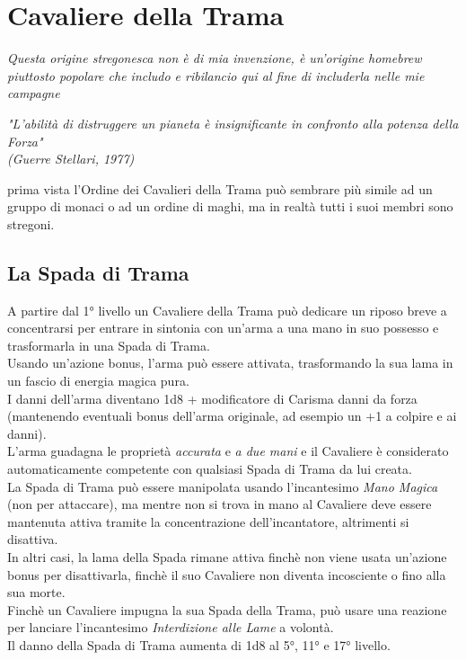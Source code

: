\section{Cavaliere della Trama}
\textit{Questa origine stregonesca non è di mia invenzione, è un'origine homebrew piuttosto popolare che includo e ribilancio qui al fine di includerla nelle mie campagne}

\begin{DndReadAloud}
  \it
  "L'abilità di distruggere un pianeta è insignificante in confronto alla potenza della Forza" \\ (Guerre Stellari, 1977)
\end{DndReadAloud}

 prima vista l'Ordine dei Cavalieri della Trama può sembrare più simile ad un gruppo di monaci o ad un ordine di maghi, ma in realtà tutti i suoi membri sono stregoni.

\subsection{La Spada di Trama}

A partire dal 1° livello un Cavaliere della Trama può dedicare un riposo breve a concentrarsi per entrare in sintonia con un'arma a una mano in suo possesso e trasformarla in una Spada di Trama. \\ Usando un'azione bonus, l'arma può essere attivata, trasformando la sua lama in un fascio di energia magica pura. \\ I danni dell'arma diventano 1d8 + modificatore di Carisma danni da forza (mantenendo eventuali bonus dell'arma originale, ad esempio un +1 a colpire e ai danni). \\ L'arma guadagna le proprietà \textit{accurata} e \textit{a due mani} e il Cavaliere è considerato automaticamente competente con qualsiasi Spada di Trama da lui creata. \\ La Spada di Trama può essere manipolata usando l'incantesimo \textit{Mano Magica} (non per attaccare), ma mentre non si trova in mano al Cavaliere deve essere mantenuta attiva tramite la concentrazione dell'incantatore, altrimenti si disattiva. \\ In altri casi, la lama della Spada rimane attiva finchè non viene usata un'azione bonus per disattivarla, finchè il suo Cavaliere non diventa incosciente o fino alla sua morte. \\ Finchè un Cavaliere impugna la sua Spada della Trama, può usare una reazione per lanciare l'incantesimo \textit{Interdizione alle Lame} a volontà. \\ Il danno della Spada di Trama aumenta di 1d8 al 5°, 11° e 17° livello.

